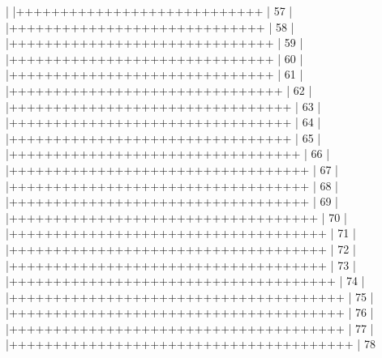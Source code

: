 \documentclass[12pt]{article}
\begin{document}
\begin{Schunk}
\begin{Soutput}
  |                                                        
  |++++++++++++++++++++++++++++                      |  57%
  |                                                        
  |+++++++++++++++++++++++++++++                     |  58%
  |                                                        
  |++++++++++++++++++++++++++++++                    |  59%
  |                                                        
  |++++++++++++++++++++++++++++++                    |  60%
  |                                                        
  |++++++++++++++++++++++++++++++                    |  61%
  |                                                        
  |+++++++++++++++++++++++++++++++                   |  62%
  |                                                        
  |++++++++++++++++++++++++++++++++                  |  63%
  |                                                        
  |++++++++++++++++++++++++++++++++                  |  64%
  |                                                        
  |++++++++++++++++++++++++++++++++                  |  65%
  |                                                        
  |+++++++++++++++++++++++++++++++++                 |  66%
  |                                                        
  |++++++++++++++++++++++++++++++++++                |  67%
  |                                                        
  |++++++++++++++++++++++++++++++++++                |  68%
  |                                                        
  |++++++++++++++++++++++++++++++++++                |  69%
  |                                                        
  |+++++++++++++++++++++++++++++++++++               |  70%
  |                                                        
  |++++++++++++++++++++++++++++++++++++              |  71%
  |                                                        
  |++++++++++++++++++++++++++++++++++++              |  72%
  |                                                        
  |++++++++++++++++++++++++++++++++++++              |  73%
  |                                                        
  |+++++++++++++++++++++++++++++++++++++             |  74%
  |                                                        
  |++++++++++++++++++++++++++++++++++++++            |  75%
  |                                                        
  |++++++++++++++++++++++++++++++++++++++            |  76%
  |                                                        
  |++++++++++++++++++++++++++++++++++++++            |  77%
  |                                                        
  |+++++++++++++++++++++++++++++++++++++++           |  78%

\end{Soutput}
\end{Schunk}
\end{document}
